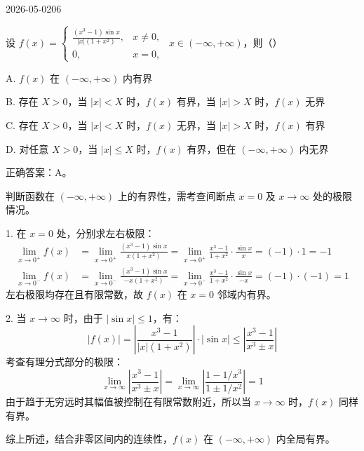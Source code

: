 \begin{mistake}{2026-05-02}{06}

\begin{problemcontent}
设 \(f(x) = \begin{cases} \frac{(x^3-1)\sin x}{|x|(1+x^2)}, & x \neq 0, \\ 0, & x = 0, \end{cases}\ \ x \in (-\infty, +\infty)\)，则（\quad ）

A. \(f(x)\) 在 \((-\infty, +\infty)\) 内有界

B. 存在 \(X>0\)，当 \(|x|<X\) 时，\(f(x)\) 有界，当 \(|x|>X\) 时，\(f(x)\) 无界

C. 存在 \(X>0\)，当 \(|x|<X\) 时，\(f(x)\) 无界，当 \(|x|>X\) 时，\(f(x)\) 有界

D. 对任意 \(X>0\)，当 \(|x| \le X\) 时，\(f(x)\) 有界，但在 \((-\infty, +\infty)\) 内无界
\end{problemcontent}

\begin{solutioncontent}
正确答案：A。

判断函数在 \((-\infty, +\infty)\) 上的有界性，需考查间断点 \(x=0\) 及 \(x \to \infty\) 处的极限情况。

1. 在 \(x=0\) 处，分别求左右极限：
\[
\begin{aligned}
\lim_{x \to 0^+} f(x) &= \lim_{x \to 0^+} \frac{(x^3-1)\sin x}{x(1+x^2)} = \lim_{x \to 0^+} \frac{x^3-1}{1+x^2} \cdot \frac{\sin x}{x} = (-1) \cdot 1 = -1 \\
\lim_{x \to 0^-} f(x) &= \lim_{x \to 0^-} \frac{(x^3-1)\sin x}{-x(1+x^2)} = \lim_{x \to 0^-} \frac{x^3-1}{1+x^2} \cdot \frac{\sin x}{-x} = (-1) \cdot (-1) = 1
\end{aligned}
\]
左右极限均存在且有限常数，故 \(f(x)\) 在 \(x=0\) 邻域内有界。

2. 当 \(x \to \infty\) 时，由于 \(|\sin x| \le 1\)，有：
\[ |f(x)| = \left| \frac{x^3-1}{|x|(1+x^2)} \right| \cdot |\sin x| \le \left| \frac{x^3-1}{x^3 \pm x} \right| \]
考查有理分式部分的极限：
\[ \lim_{x \to \infty} \left| \frac{x^3-1}{x^3 \pm x} \right| = \lim_{x \to \infty} \left| \frac{1 - 1/x^3}{1 \pm 1/x^2} \right| = 1 \]
由于趋于无穷远时其幅值被控制在有限常数附近，所以当 \(x \to \infty\) 时，\(f(x)\) 同样有界。

综上所述，结合非零区间内的连续性，\(f(x)\) 在 \((-\infty, +\infty)\) 内全局有界。
\end{solutioncontent}


\end{mistake}
